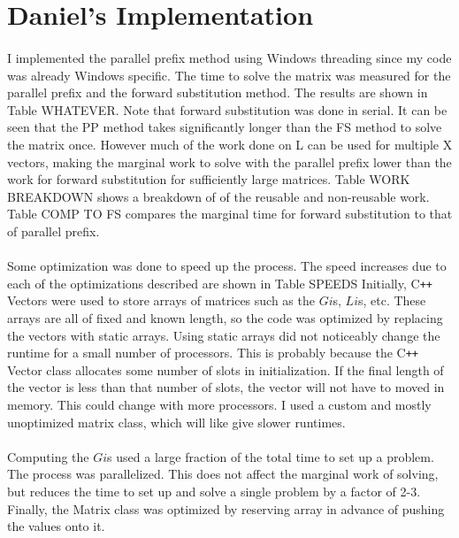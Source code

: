 \documentclass[a4paper,12pt]{article}
\begin{document}
\section*{Daniel's Implementation}
	\paragraph*{}
		I implemented the parallel prefix method using Windows threading since my code was already Windows specific.  The time to solve the matrix was measured for the parallel prefix and the forward substitution method.  The results are shown in Table WHATEVER.  Note that forward substitution was done in serial.  It can be seen that the PP method takes significantly longer than the FS method to solve the matrix once.  However much of the work done on L can be used for multiple X vectors, making the marginal work to solve with the parallel prefix lower than the work for forward substitution for sufficiently large matrices.  Table WORK BREAKDOWN shows a breakdown of of the reusable and non-reusable work.  Table COMP TO FS compares the marginal time for forward substitution to that of parallel prefix.  
	\paragraph*{}
		Some optimization was done to speed up the process.  The speed increases due to each of the optimizations described are shown in Table SPEEDS Initially, C\verb!++! Vectors were used to store arrays of matrices such as the $Gi$s, $Li$s, etc.  These arrays are all of fixed and known length, so the code was optimized by replacing the vectors with static arrays.  Using static arrays did not noticeably change the runtime for a small number of processors.  This is probably because the C\verb!++! Vector class allocates some number of slots in initialization.  If the final length of the vector is less than that number of slots, the vector will not have to moved in memory.  This could change with more processors.  I used a custom and mostly unoptimized matrix class, which will like give slower runtimes.  
	\paragraph*{}
		Computing the $Gi$s used a large fraction of the total time to set up a problem.  The process was parallelized.  This does not affect the marginal work of solving, but reduces the time to set up and solve a single problem by a factor of 2-3.  Finally, the Matrix class was optimized by reserving array in advance of pushing the values onto it.  
\end{document}
